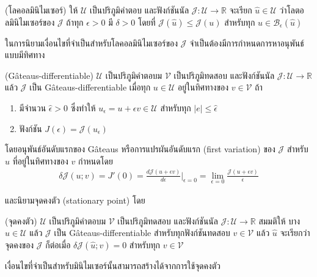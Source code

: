 \begin{Definition}
    (โลคอลมินิไมเซอร์) ให้ $\mathcal{U}$ เป็นปริภูมิคำตอบ และฟังก์ชันนัล $\mathcal{J} : \mathcal{U} \rightarrow \mathbb{R} $ จะเรียก $\hat{u} \in \mathcal{U}$ ว่าโลตอลมินิไมเซอร์ของ $\mathcal{J}$ ถ้าทุก $\epsilon > 0 $ มี $\delta > 0$ โดยที่ $\mathcal{J}(\hat{u}) \leq \mathcal{J}(u)$ สำหรับทุก $u \in \mathcal{B}_{\epsilon}(\hat{u})$ 
\end{Definition}

ในการนิยามเงื่อนไขที่จำเป็นสำหรับโลคอลมินิไมเซอร์ของ $\mathcal{J}$ จำเป็นต้องมีการกำหนดการหาอนุพันธ์แบบมีทิศทาง

\begin{Definition}
    (G\^{a}teaus-differentiable)
    $\mathcal{U}$ เป็นปริภูมิคำตอบม $\mathcal{V}$ เป็นปริภูมิทดสอบ และฟังก์ชันนัล $\mathcal{J} : \mathcal{U} \rightarrow \mathbb{R}$ แล้ว $\mathcal{J}$ เป็น G\^{a}teaus-differentiable เมื่อทุก $u \in \mathcal{U}$ อยู่ในทิศทางของ $v \in \mathcal{V}$ ถ้า
    \begin{enumerate}
        \item มีจำนวน $\hat{\epsilon} > 0$ ซึ่งทำให้ $u_{\epsilon} = u + \epsilon v \in \mathcal{U}$ สำหรับทุก $|e| \leq \hat{\epsilon}$
        \item ฟังก์ชัน $J(\epsilon) = \mathcal{J}(u_\epsilon)$
    \end{enumerate}
    โดยอนุพันธ์อันดับแรกของ G\^{a}teaus หรือการแปรผันอันดับแรก (first variation) ของ $\mathcal{J}$ สำหรับ $u$ ที่อยู่ในทิศทางของ $v$ กำหนดโดย
    \begin{align*}
        \delta \mathcal{J}(u;v) = J'(0) = \frac{d\mathcal{J}(u + \epsilon v)}{d \epsilon} \Big|_{\epsilon = 0} = \lim_{\epsilon = 0}\frac{\mathcal{J}(u + \epsilon v)}{\epsilon} 
    \end{align*}
\end{Definition}

และนิยามจุดคงตัว (stationary point) โดย

\begin{Definition}
(จุดคงตัว) $\mathcal{U}$ เป็นปริภูมิคำตอบม $\mathcal{V}$ เป็นปริภูมิทดสอบ และฟังก์ชันนัล $\mathcal{J} : \mathcal{U} \rightarrow \mathbb{R}$ สมมติให้ บาง $\hat{u} \in \mathcal{U}$ แล้ว $\mathcal{J}$ เป็น G\^{a}teaus-differentiable สำหรับทุกฟังก์ชันทดสอบ $v \in \mathcal{V}$ แล้ว $\hat{u}$ จะเรียกว่าจุดคงของ $\mathcal{J}$ ก็ต่อเมื่อ $\delta\mathcal{J}(\hat{u};v) = 0$ สำหรับทุก $v \in \mathcal{V}$
\end{Definition}

เงื่อนไขที่จำเป็นสำหรับมินิไมเซอร์นั้นสามารถสร้างได้จากการใช้จุดคงตัว

